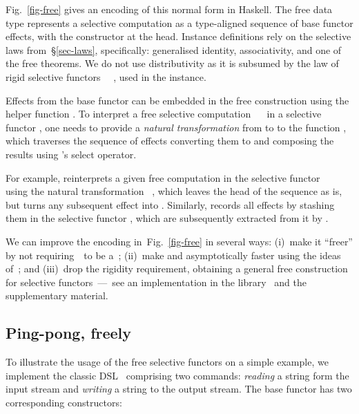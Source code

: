 Fig.~\ref{fig-free} gives an encoding of this normal form in Haskell. The free
data type  represents a selective computation as a type-aligned
sequence of base functor effects, with the  constructor at the head.
Instance definitions rely on the selective laws from~\S\ref{sec-laws},
specifically: generalised identity, associativity, and one of the free theorems.
We do not use distributivity as it is subsumed by the law of rigid selective
functors \hs{(<*>)}~\hs{=}~, used in the  instance.

Effects from the base functor can be embedded in the free construction using
the helper function . To interpret a free selective computation
~~ in a selective functor , one needs to provide
a \emph{natural transformation} from  to  to the function
, which traverses the sequence of effects converting them to
 and composing the results using 's select operator.

For example,  reinterprets a given free computation in the selective
functor ~\hs{=}~ using the natural transformation
~, which leaves the  head of the sequence as is,
but turns any subsequent effect into . Similarly, 
records all effects by stashing them in the selective functor , which
are subsequently extracted from it by .

We can improve the encoding in~Fig.~\ref{fig-free} in several ways: (i)~make it
``freer'' by not requiring~~to be a~; (ii)~make  and
 asymptotically faster using the ideas
of~\citet{menendez2013free}; and (iii)~drop the rigidity requirement,
obtaining a general free construction for selective functors~---~see an
implementation in the library~\citep{selective2019haskell} and the supplementary
material.

\subsection{Ping-pong, freely}\label{sec-free-ping-pong}

To illustrate the usage of the free selective functors on a simple example,
we implement the classic  DSL~\cite{swierstra2008data} comprising
two commands: \emph{reading} a string form the input stream and \emph{writing}
a string to the output stream. The base functor has two corresponding
constructors:

